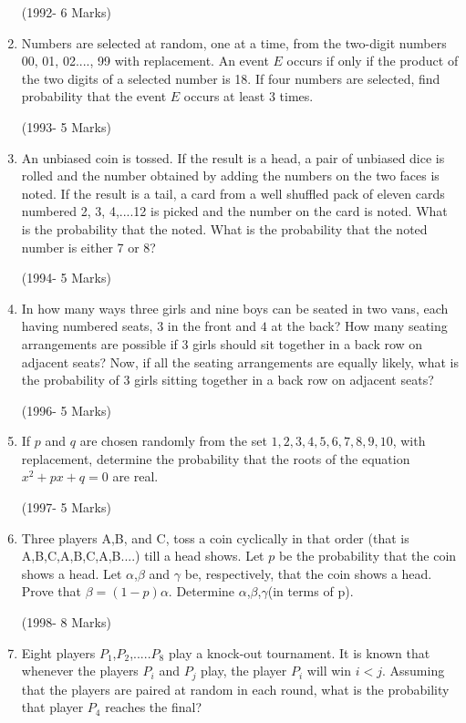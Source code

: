 \documentclass[journal,12pt,onecolumn]{IEEEtran}
\theoremstyle{remark}
\begin{document}
\begin{enumerate}
\hfill(1992- 6 Marks)

\item Numbers are selected at random, one at a time, from the two-digit numbers 00, 01, 02...., 99 with replacement. An event $E$ occurs if only if the product of the two digits of a selected number is 18. If four numbers are selected, find probability that the event $E$ occurs at least 3 times.

\hfill(1993- 5 Marks)

\item An unbiased coin is tossed. If the result is a head, a pair of unbiased dice is rolled and the number obtained by adding the numbers on the two faces is noted. If the result is a tail, a card from a well shuffled pack of eleven cards numbered 2, 3, 4,....12 is picked and the number on the card is noted. What is the probability that the noted. What is the probability that the noted number is either 7 or 8?

\hfill(1994- 5 Marks)

\item In how many ways three girls and nine boys can be seated in two vans, each having numbered seats, $3$ in the front and $4$ at the back? How many seating arrangements are possible if 3 girls should sit together in a back row on adjacent seats? Now, if all the seating arrangements are equally likely, what is the probability of 3 girls sitting together in a back row on adjacent seats?

\hfill(1996- 5 Marks)

\item If $p$ and $q$ are chosen randomly from the set ${1,2,3,4,5,6,7,8,9,10}$, with replacement, determine the probability that the roots of the equation $x^2+px+q=0$ are real.
                                                      
\hfill(1997- 5 Marks)

\item Three players A,B, and C, toss a coin cyclically in that order (that is A,B,C,A,B,C,A,B....) till a head shows. Let $p$ be the probability that the coin shows a head. Let $\alpha$,$\beta$ and $\gamma$ be, respectively, that the coin shows a head. Prove that $\beta=(1-p)\alpha$. Determine $\alpha$,$\beta$,$\gamma$(in terms of p).

\hfill(1998- 8 Marks)

\item Eight players $P_{1}$,$P_{2}$,.....$P_{8}$ play a knock-out tournament. It is known that whenever the players $P_{i}$ and $P_{j}$ play, the player $P_{i}$ will win $i<j$. Assuming that the players are paired at random in each round, what is the probability that player $P_{4}$ reaches the final?


\end{enumerate}
\end{document}
